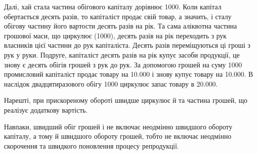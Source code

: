 Далі, хай стала частина обігового капіталу дорівнює 1000.
Коли капітал обертається десять разів, то капіталіст продає свій товар, а
значить, і сталу обігову частину його вартости десять разів на рік. Та
сама аліквотна частина грошової маси, що циркулює (1000),
десять разів на рік переходить з рук власників цієї частини до рук капіталіста.
Десять разів переміщуються ці гроші з рук у руки. Подруге,
капіталіст десять разів на рік купує засоби продукції, це знову є десять
обігів грошей з рук до рук. За допомогою грошей на суму 1000
промисловий капіталіст продає товару на \num{10.000} і знову купує
товару на \num{10.000}. В наслідок двадцятиразового обігу 1000
циркулює запас товару в \num{20.000}.

Нарешті, при прискореному обороті швидше циркулює й та частина
грошей, що реалізує додаткову вартість.

Навпаки, швидший обіг грошей і не включає неодмінно швидшого обороту
капіталу, а тому й швидшого обороту грошей, тобто не включає
неодмінно скорочення та швидкого поновлення процесу репродукції.
